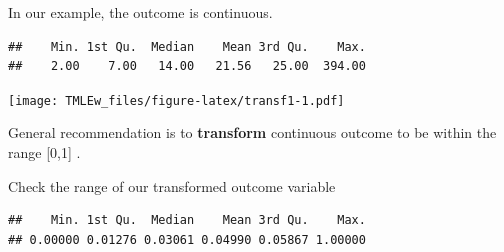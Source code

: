 \documentclass[
]{book}
\newenvironment{Shaded}{\begin{snugshade}}{\end{snugshade}}
\newcommand{\AttributeTok}[1]{\textcolor[rgb]{0.77,0.63,0.00}{#1}}
\newcommand{\FunctionTok}[1]{\textcolor[rgb]{0.00,0.00,0.00}{#1}}
\newcommand{\NormalTok}[1]{#1}
\newcommand{\OtherTok}[1]{\textcolor[rgb]{0.56,0.35,0.01}{#1}}
\newcommand{\SpecialCharTok}[1]{\textcolor[rgb]{0.00,0.00,0.00}{#1}}
\newcommand{\StringTok}[1]{\textcolor[rgb]{0.31,0.60,0.02}{#1}}
\begin{document}
In our example, the outcome is continuous.

\begin{Shaded}
\end{Shaded}

\begin{verbatim}
##    Min. 1st Qu.  Median    Mean 3rd Qu.    Max. 
##    2.00    7.00   14.00   21.56   25.00  394.00
\end{verbatim}

\begin{Shaded}
\end{Shaded}

\texttt{[image: TMLEw\_files/figure-latex/transf1-1.pdf]}

General recommendation is to \textbf{transform} continuous outcome to be within the range {[}0,1{]} \citep{gruber2010targeted}.

\begin{Shaded}
\end{Shaded}

Check the range of our transformed outcome variable

\begin{Shaded}
\end{Shaded}

\begin{verbatim}
##    Min. 1st Qu.  Median    Mean 3rd Qu.    Max. 
## 0.00000 0.01276 0.03061 0.04990 0.05867 1.00000
\end{verbatim}
\end{document}
